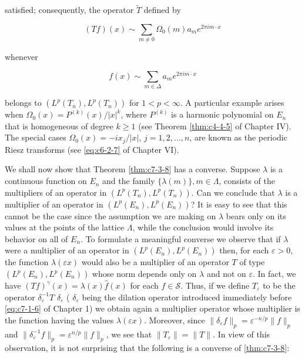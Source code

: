 satisfied; consequently, the operator $\tilde{T}$ defined by

\[
(T f)(x)\sim\sum_{m\neq0}\Omega_{0}(m)a_{m}e^{2\pi i m\cdot x}
\]

whenever

\[
f(x)\sim\sum_{m\in\Delta}a_{m}e^{2\pi i m\cdot x}
\]

belongs to $(L^p(T_n), L^p(T_n))$ for $1 < p < \infty$. A particular example arises when $\Omega_0(x) = P^{(k)}(x)/|x|^k$, where $P^{(k)}$ is a harmonic polynomial on $E_n$ that is homogeneous of degree $k \geq 1$ (see Theorem \ref{thm:c4-4-5} of Chapter IV). The special cases $\Omega_0(x) = -ix_j/|x|$, $j = 1, 2, \ldots, n$, are known as the periodic Riesz transforms (see \eqref{eq:c6-2-7} of Chapter VI).

We shall now show that Theorem \ref{thm:c7-3-8} has a converse. Suppose $\lambda$ is a continuous function on $E_n$ and the family $\{\lambda(m)\}, m \in \Lambda$, consists of the multipliers of an operator in $(L^p(T_n), L^p(T_n))$. Can we conclude that $\lambda$ is a multiplier of an operator in $(L^p(E_n), L^p(E_n))$? It is easy to see that this cannot be the case since the assumption we are making on $\lambda$ bears only on its values at the points of the lattice $\Lambda$, while the conclusion would involve its behavior on all of $E_n$. To formulate a meaningful converse we observe that if $\lambda$ were a multiplier of an operator in $(L^p(E_n), L^p(E_n))$ then, for each $\varepsilon > 0$, the function $\lambda(\varepsilon x)$ would also be a multiplier of an operator $T$ of type $(L^p(E_n), L^p(E_n))$ whose norm depends only on $\lambda$ and not on $\varepsilon$. In fact, we have $(Tf)^\gamma(x) = \lambda(x) \hat{f}(x)$ for each $f \in \mathcal{S}$. Thus, if we define $T_\varepsilon$ to be the operator $\delta_\varepsilon^{-1}T$ $\delta_\varepsilon$ ( $\delta_\varepsilon$ being the dilation operator introduced immediately before \eqref{eq:c7-1-6} of Chapter 1) we obtain again a multiplier operator whose multiplier is the function having the values $\lambda(\varepsilon x)$. Moreover, since $\|\delta_\varepsilon f\|_p = \varepsilon^{-n/p} \|f\|_p$ and $\|\delta_\varepsilon^{-1}f\|_p = \varepsilon^{n/p} \|f\|_p$, we see that $\|T_\varepsilon\| = \|T\|$. In view of this observation, it is not surprising that the following is a converse of \eqref{thm:c7-3-8}:

